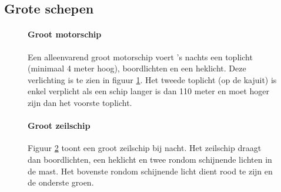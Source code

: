 \subsection{Grote schepen}
\begin{figure}[H]
	\centering
	\begin{minipage}[t]{0.75\textwidth}
	\paragraph{Groot motorschip}
	Een alleenvarend groot motorschip voert 's nachts een toplicht (minimaal 4 meter hoog), boordlichten en een heklicht. Deze verlichting is te zien in figuur \ref{pic:optisch:grootmotor}. Het tweede toplicht (op de kajuit) is enkel verplicht als een schip langer is dan 110 meter en moet hoger zijn dan het voorste toplicht.
	\end{minipage}
	\hfill
	\begin{minipage}[t]{0.22\textwidth}
	\RemoveLine
	\caption{}
	\label{pic:optisch:grootmotor}
\end{minipage}
\end{figure}
\vspace{-0.6cm}
\begin{figure}[H]
	\centering
	\begin{minipage}[t]{0.75\textwidth}
		\paragraph{Groot zeilschip}
		Figuur \ref{pic:optisch:grootzeil} toont een groot zeilschip bij nacht. Het zeilschip draagt dan boordlichten, een heklicht en twee rondom schijnende lichten in de mast. Het bovenste rondom schijnende licht dient rood te zijn en de onderste groen. 
	\end{minipage}
	\hfill
	\begin{minipage}[t]{0.22\textwidth}
		\RemoveLine
		\caption{}
		\label{pic:optisch:grootzeil}
	\end{minipage}
\end{figure}
\vspace{-0.6cm}
